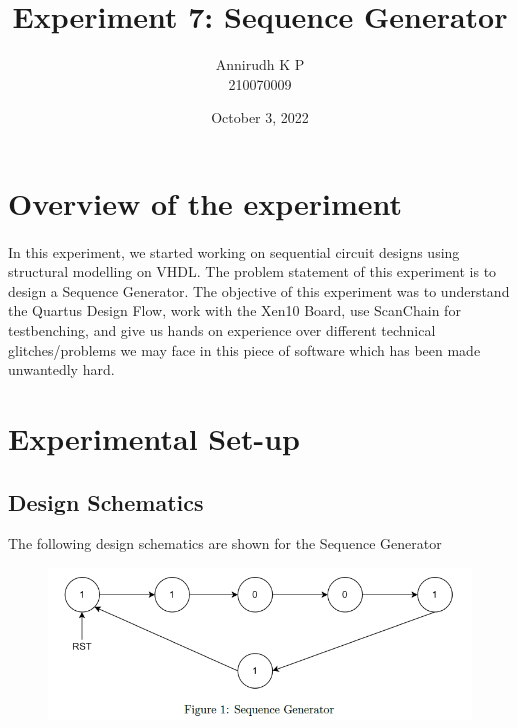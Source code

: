 \documentclass[12pt]{article}
\title{Experiment 7: Sequence Generator}
\author{Annirudh K P\\%
210070009}
\date{October 3, 2022}
\begin{document}
\maketitle

\section{Overview of the experiment}
\paragraph{}
In this experiment, we started working on sequential circuit designs using structural modelling on VHDL. The problem statement of this experiment is to design a Sequence Generator. The objective of this experiment was to understand the Quartus Design Flow, work with the Xen10 Board, use ScanChain for testbenching, and give us hands on experience over different technical glitches/problems we may face in this piece of software which has been made unwantedly hard.

\section{Experimental Set-up}

\subsection{Design Schematics}
The following design schematics are shown for the Sequence Generator 

\begin{figure}[H]
\centering
  \includegraphics[scale=0.3]{Images/SeqGen_ProbStat.png}
  \caption{}
\end{figure}
\end{document}
